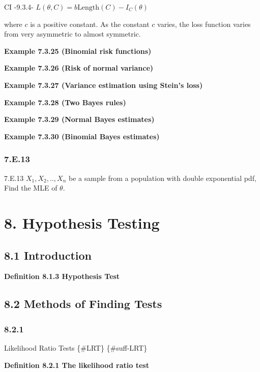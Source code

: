 \documentclass[10pt,twocolumn,portrait]{article}
\begin{document}
CI -9.3.4- \(L(\theta,C)=b\text{Length}(C)-I_C(\theta)\)

where \(c\) is a positive constant. As the constant \(c\) varies, the
loss function varies from very asymmetric to almost symmetric.

\textbf{Example 7.3.25 (Binomial risk functions)}

\textbf{Example 7.3.26 (Risk of normal variance)}

\textbf{Example 7.3.27 (Variance estimation using Stein's loss)}

\textbf{Example 7.3.28 (Two Bayes rules)}

\textbf{Example 7.3.29 (Normal Bayes estimates)}

\textbf{Example 7.3.30 (Binomial Bayes estimates)}

\hypertarget{e.13}{%
\subsubsection{7.E.13}\label{e.13}}

7.E.13 \(X_1,X_2,..,X_n\) be a sample from a population with double
exponential pdf, Find the MLE of \(\theta\).

\hypertarget{hypothesis-testing}{%
\section{8. Hypothesis Testing}\label{hypothesis-testing}}

\hypertarget{HypoT}{%
\subsection{8.1 Introduction}\label{HypoT}}

\textbf{Definition 8.1.3 Hypothesis Test}

\hypertarget{methods-of-finding-tests}{%
\subsection{8.2 Methods of Finding
Tests}\label{methods-of-finding-tests}}

\hypertarget{section-6}{%
\subsubsection{8.2.1}\label{section-6}}

Likelihood Ratio Tests \{\#LRT\} \{\#suff-LRT\}

\textbf{Definition 8.2.1 The likelihood ratio test}
\end{document}
